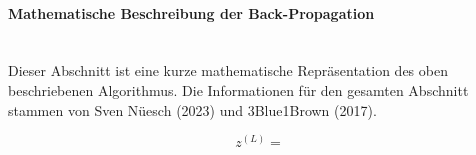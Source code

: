 \paragraph{Mathematische Beschreibung der Back-Propagation}
\label{sec:forward_propagation_math}
\mbox{}\\\noindent Dieser Abschnitt ist eine kurze mathematische Repräsentation des oben beschriebenen Algorithmus. Die Informationen für den gesamten Abschnitt stammen von Sven Nüesch (2023) und 3Blue1Brown (2017).

\[z^{(L)} = \]